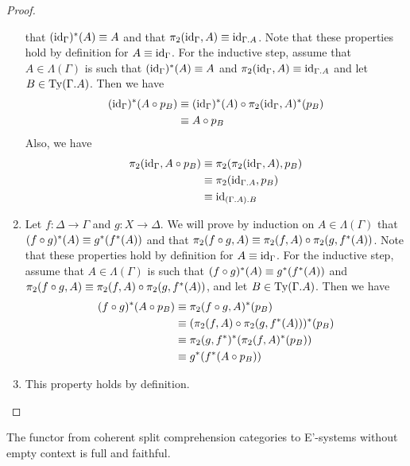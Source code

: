 \begin{proof}
\begin{enumerate}[label=(\alph*)]
that $({\mathrm{id}_{\Gamma}})^\ast(A)\equiv A$ and that $\pi_2(\catid{\Gamma},A)\jdeq \catid{\ctxext{\Gamma}{A}}$.
Note that these properties hold by definition for $A\equiv{\mathrm{id}_{\Gamma}}$. For the
inductive step, assume that $A\in\Lambda(\Gamma)$ is such that
$({\mathrm{id}_{\Gamma}})^\ast(A)\equiv A$ and $\pi_2(\catid{\Gamma},A)\jdeq
\catid{\ctxext{\Gamma}{A}}$ and let $B\in\mathrm{Ty}(\ctxext{\Gamma}{A})$. Then
we have
\begin{align*}
({\mathrm{id}_{\Gamma}})^\ast(A\circ p_B) & \equiv ({\mathrm{id}_{\Gamma}})^\ast(A)\circ \pi_2({\mathrm{id}_{\Gamma}},A)^\ast(p_B) \\
& \equiv A\circ p_B
\end{align*}
Also, we have
\begin{align*}
\pi_2(\catid{\Gamma},A\circ p_B) & \jdeq \pi_2(\pi_2(\catid{\Gamma},A),p_B) \\
& \jdeq \pi_2(\catid{\ctxext{\Gamma}{A}},p_B) \\
& \jdeq \catid{\ctxext{{\Gamma}{A}}{B}}
\end{align*}
\item Let $f:\Delta\to \Gamma$ and $g:X\to \Delta$. We will prove by induction
on $A\in\Lambda(\Gamma)$ that $(f\circ g)^\ast(A)\equiv g^\ast(f^\ast(A))$ and
that $\pi_2(f\circ g,A)\equiv \pi_2(f,A)\circ \pi_2(g,f^\ast(A))$. Note that
these properties hold by definition for $A\equiv{\mathrm{id}_{\Gamma}}$. For the inductive
step, assume that $A\in\Lambda(\Gamma)$ is such that $(f\circ g)^\ast(A)\equiv g^\ast(f^\ast(A))$ and
$\pi_2(f\circ g,A)\equiv \pi_2(f,A)\circ \pi_2(g,f^\ast(A))$, and let
$B\in\mathrm{Ty}(\ctxext{\Gamma}{A})$. Then we have
\begin{align*}
(f\circ g)^\ast(A\circ p_B) & \equiv \pi_2(f\circ g,A)^\ast(p_B) \\
& \equiv (\pi_2(f,A)\circ\pi_2(g,f^\ast(A)))^\ast(p_B) \\
& \equiv \pi_2(g,f^\ast)^\ast(\pi_2(f,A)^\ast(p_B)) \\
& \equiv g^\ast(f^\ast(A\circ p_B))
\end{align*}
\item This property holds by definition.\qedhere
\end{enumerate}
\end{proof}

\begin{conj}
The functor from coherent split comprehension categories to E'-systems without
empty context is full and faithful.
\end{conj}

